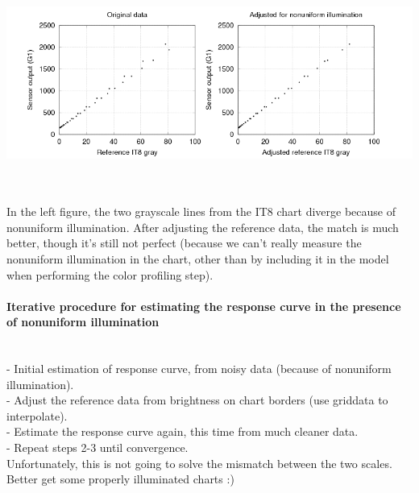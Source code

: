 \begin{center}
\includegraphics[height=7cm]{images/it8_lum_check}
\end{center}

In the left figure, the two grayscale lines from the IT8 chart diverge because of nonuniform illumination. After adjusting the reference data, the match is much better, though it's still not perfect (because we can't really measure the nonuniform illumination in the chart, other than by including it in the model when performing the color profiling step).\\

\paragraph{Iterative procedure for estimating the response curve in the presence of nonuniform illumination}\mbox{}\\

- Initial estimation of response curve, from noisy data (because of nonuniform illumination).\\
- Adjust the reference data from brightness on chart borders (use griddata to interpolate).\\
- Estimate the response curve again, this time from much cleaner data.\\
- Repeat steps 2-3 until convergence.\\ 

Unfortunately, this is not going to solve the mismatch between the two scales. Better get some properly illuminated charts :)
